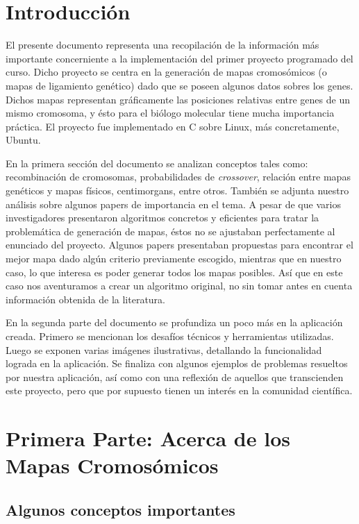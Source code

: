 \documentclass{article}
\begin{document}
	

	\tableofcontents
	\pagebreak
	
	\section{Introducción}
	
	El presente documento representa una recopilación de la información más importante concerniente a la implementación del primer proyecto programado del curso. Dicho proyecto se centra en la generación de mapas cromosómicos (o mapas de ligamiento genético) dado que se poseen algunos datos sobres los genes. Dichos mapas representan gráficamente las posiciones relativas entre genes de un mismo cromosoma, y ésto para el biólogo molecular tiene mucha importancia práctica. El proyecto fue implementado en C sobre Linux, más concretamente, Ubuntu.
	
	En la primera sección del documento se analizan conceptos tales como: recombinación de cromosomas, probabilidades de \emph{crossover}, relación entre mapas genéticos y mapas físicos, centimorgans, entre otros. También se adjunta nuestro análisis sobre algunos papers de importancia en el tema. A pesar de que varios investigadores presentaron algoritmos concretos y eficientes para tratar la problemática de generación de mapas, éstos no se ajustaban perfectamente al enunciado del proyecto. Algunos papers presentaban propuestas para encontrar el mejor mapa dado algún criterio previamente escogido, mientras que en nuestro caso, lo que  interesa es poder generar todos los mapas posibles. Así que en este caso nos aventuramos a crear un algoritmo original, no sin tomar antes en cuenta información obtenida de la literatura.
	
	En la segunda parte del documento se profundiza un poco más en la aplicación creada. Primero se mencionan los desafíos técnicos y herramientas utilizadas. Luego se exponen varias imágenes ilustrativas, detallando la funcionalidad lograda en la aplicación. Se finaliza con algunos ejemplos de problemas resueltos por nuestra aplicación, así como con una reflexión de aquellos que transcienden este proyecto, pero que por supuesto tienen un interés en la comunidad científica.
	
	\section{Primera Parte: Acerca de los Mapas Cromosómicos}
	
	\subsection{Algunos conceptos importantes}
	
\end{document}
